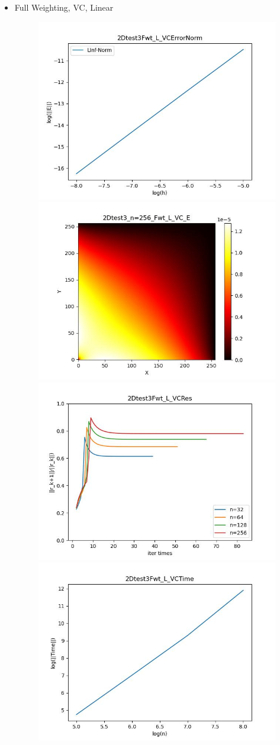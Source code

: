 \documentclass{article}
\begin{document}
\begin{itemize}
    \item Full Weighting, VC, Linear
    \begin{figure}[h]
        \centering
        \includegraphics[width=0.35\linewidth]{2Dtest3Fwt_L_VCErrorNorm.jpg}
        \includegraphics[width=0.35\linewidth]{2Dtest3_n=256_Fwt_L_VC_E.jpg}
        \includegraphics[width=0.35\linewidth]{2Dtest3Fwt_L_VCRes.jpg}
        \includegraphics[width=0.35\linewidth]{2Dtest3Fwt_L_VCTime.jpg}
    \end{figure}
    

\end{itemize}
\end{document}
